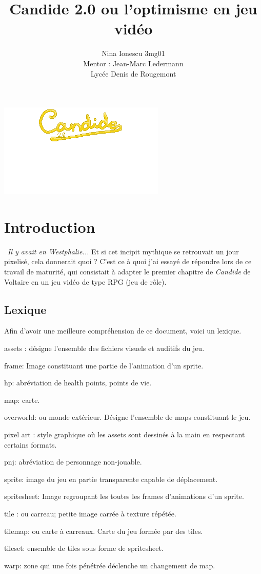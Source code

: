 \documentclass[11pt]{article}
\begin{document}
\title{Candide 2.0 ou l'optimisme en jeu vidéo }
\author{Nina Ionescu 3mg01 \\ Mentor : Jean-Marc Ledermann \\ Lycée Denis de Rougemont}
\date{}
\maketitle
\includegraphics{title}
\newpage
\tableofcontents
\newpage
{}
\section{Introduction}\
\textit {Il y avait en Westphalie...} Et si cet incipit mythique se retrouvait un jour pixelisé, cela donnerait quoi ? C'est ce à quoi j'ai essayé de répondre lors de ce travail de maturité, qui consistait à adapter le premier chapitre de \textit{Candide} de Voltaire en un jeu vidéo de type RPG (jeu de rôle).
\subsection{Lexique}
Afin d'avoir une meilleure compréhension de ce document, voici un lexique. \\
\begin{list}{}{}
\item assets : désigne l'ensemble des fichiers visuels et auditifs du jeu.
\item frame: Image constituant une partie de l'animation d'un sprite.
\item hp: abréviation de health points, points de vie.
\item map: carte.
\item overworld: ou monde extérieur. Désigne l'ensemble de maps constituant le jeu.
\item pixel art : style graphique où les assets sont dessinés à la main en respectant certains formats.
\item pnj: abréviation de personnage non-jouable.
\item sprite: image du jeu en partie transparente capable de déplacement.
\item spritesheet: Image regroupant les toutes les frames d'animations d'un sprite.
\item tile : ou carreau; petite image carrée à texture répétée.
\item tilemap: ou carte à carreaux. Carte du jeu formée par des tiles.
\item tileset: ensemble de tiles sous forme de spritesheet.
\item warp: zone qui une fois pénétrée déclenche un changement de map.
\end{list}
\end{document}
